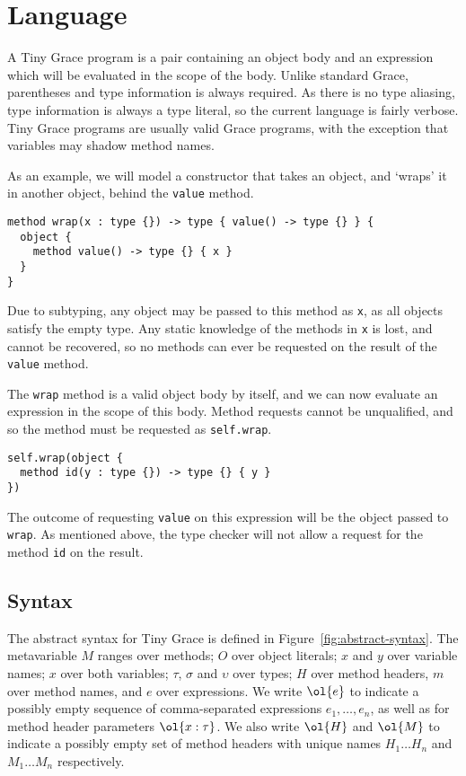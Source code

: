 \section{Language}\label{sec:language}

A Tiny Grace program is a pair containing an object body and an expression which
will be evaluated in the scope of the body. Unlike standard Grace, parentheses
and type information is always required. As there is no type aliasing, type
information is always a type literal, so the current language is fairly verbose.
Tiny Grace programs are usually valid Grace programs, with the exception that
variables may shadow method names.

As an example, we will model a constructor that takes an object, and `wraps' it
in another object, behind the \lstinline{value} method.

\begin{lstlisting}
method wrap(x : type {}) -> type { value() -> type {} } {
  object {
    method value() -> type {} { x }
  }
}
\end{lstlisting}

\noindent Due to subtyping, any object may be passed to this method as
\lstinline{x}, as all objects satisfy the empty type. Any static knowledge of
the methods in \lstinline{x} is lost, and cannot be recovered, so no methods can
ever be requested on the result of the \lstinline{value} method.

The \lstinline{wrap} method is a valid object body by itself, and we can now
evaluate an expression in the scope of this body. Method requests cannot be
unqualified, and so the method must be requested as \lstinline{self.wrap}.

\begin{lstlisting}
self.wrap(object {
  method id(y : type {}) -> type {} { y }
})
\end{lstlisting}

\noindent The outcome of requesting \lstinline{value} on this expression will be
the object passed to \lstinline{wrap}. As mentioned above, the type checker will
not allow a request for the method \lstinline{id} on the result.

\subsection{Syntax}\label{sec:syntax}

The abstract syntax for Tiny Grace is defined in
Figure~\ref{fig:abstract-syntax}. The metavariable $M$ ranges over methods; $O$
over object literals; $x$ and $y$ over variable names; $x$ over both variables;
$\tau$, $\sigma$ and $\upsilon$ over types; $H$ over method headers, $m$ over
method names, and $e$ over expressions. We write $\ol{e}$ to indicate a possibly
empty sequence of comma-separated expressions $e_1, \dots, e_n$, as well as for
method header parameters $\ol{x : \tau}$. We also write $\ol{H}$ and $\ol{M}$ to
indicate a possibly empty set of method headers with unique names $H_1 \dots
H_n$ and $M_1 \dots M_n$ respectively.


